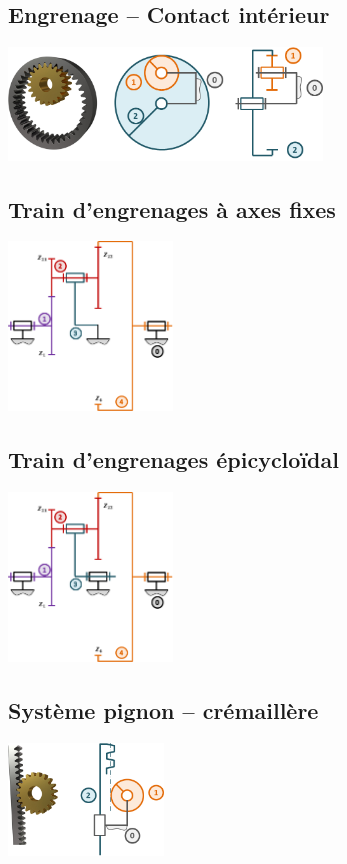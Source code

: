 \subsection*{Engrenage -- Contact intérieur}
\begin{center}
\includegraphics[height=3cm]{images/fig_02.png}
\end{center}

\subsection*{Train d'engrenages à axes fixes}
\begin{center}
\includegraphics[height=4.5cm]{images/fig_06.png}
\end{center}


\subsection*{Train d'engrenages épicycloïdal}
\begin{center}
\includegraphics[height=4.5cm]{images/fig_05.png}
\end{center}

\subsection*{Système pignon -- crémaillère}
\begin{center}
\includegraphics[height=3cm]{images/fig_03.png}
\end{center}

